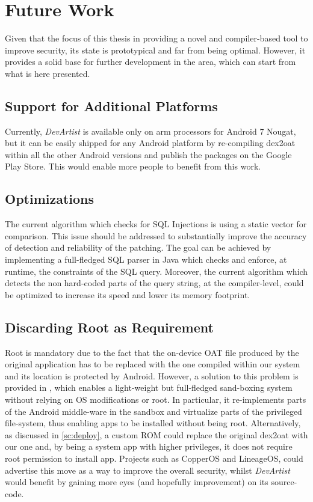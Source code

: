 \chapter{Future Work}
\label{ch:futurework}
Given that the focus of this thesis in providing a novel and compiler-based tool to improve security, its state is prototypical and far from being optimal. However, it provides a solid base for further development in the area, which can start from what is here presented.

\section{Support for Additional Platforms}
Currently, \emph{DevArtist} is available only on arm processors for Android 7 Nougat, but it can be easily shipped for any Android platform by re-compiling dex2oat within all the other Android versions and publish the packages on the Google Play Store. This would enable more people to benefit from this work.

\section{Optimizations}
The current algorithm which checks for SQL Injections is using a static vector for comparison. This issue should be addressed to substantially improve the accuracy of detection and reliability of the patching. The goal can be achieved by implementing a full-fledged SQL parser in Java which checks and enforce, at runtime, the constraints of the SQL query. Moreover, the current algorithm which detects the non hard-coded parts of the query string, at the compiler-level, could be optimized to increase its speed and lower its memory footprint.

\section{Discarding Root as Requirement}
\label{sc:discardroot}
Root is mandatory due to the fact that the on-device OAT file produced by the original application has to be replaced with the one compiled within our system and its location is protected by Android. However, a solution to this problem is provided in \cite{boxify}, which enables a light-weight but full-fledged sand-boxing system without relying on OS modifications or root. In particular, it re-implements parts of the Android middle-ware in the sandbox and virtualize parts of the privileged file-system, thus enabling apps to be installed without being root. Alternatively, as discussed in \ref{sc:deploy}, a custom ROM could replace the original dex2oat with our one and, by being a system app with higher privileges, it does not require root permission to install app. Projects such as CopperOS and LineageOS, could advertise this move as a way to improve the overall security, whilst \emph{DevArtist} would benefit by gaining more eyes (and hopefully improvement) on its source-code.

